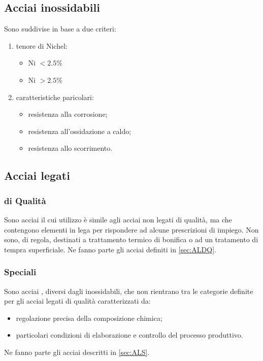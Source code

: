 \subsection{Acciai inossidabili}
Sono suddivise in base a due criteri:
\begin{enumerate}
\item tenore di Nichel:
\begin{itemize}
\item Ni $<2.5\%$
\item Ni $>2.5\%$
\end{itemize}
\item caratteristiche paricolari:
\begin{itemize}
\item resistenza alla corrosione;
\item resistenza all'ossidazione a caldo;
\item resistenza allo scorrimento.
\end{itemize}
\end{enumerate}
\newpage
\subsection{Acciai legati}
\begin{multicols}{2}[]
\subsubsection{di Qualità}
Sono acciai il cui utilizzo è simile agli acciai non legati di qualità, ma che contengono elementi in lega per rispondere ad alcune prescrizioni di impiego.
Non sono, di regola, destinati a trattamento termico di bonifica o ad un tratamento di tempra superficiale.
Ne fanno parte gli acciai definiti in \ref{sec:ALDQ}.
\columnbreak
\subsubsection{Speciali}
Sono acciai , diversi dagli inossidabili, che non rientrano tra le categorie definite per gli acciai legati di qualità caratterizzati da:
\begin{itemize}
\item regolazione precisa della composizione chimica;
\item particolari condizioni di elaborazione e controllo del processo produttivo.
\end{itemize}
Ne fanno parte gli acciai descritti in \ref{sec:ALS}.
\end{multicols}

